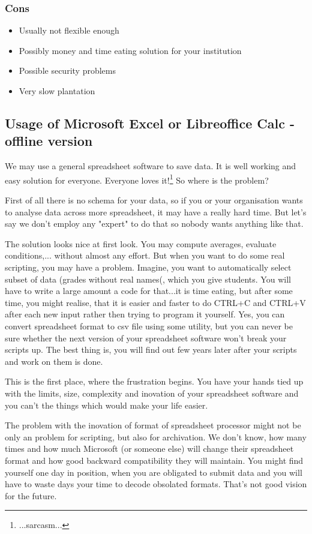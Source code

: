\subsubsection{Cons}
\begin{itemize}
\item Usually not flexible enough
\item Possibly money and time eating solution for your institution
\item Possible security problems
\item Very slow plantation
\end{itemize}

\subsection{Usage of Microsoft Excel or Libreoffice Calc - offline version}
We may use a general spreadsheet software to save data. It is well working and easy solution for everyone. Everyone loves it!\footnote{...sarcasm...} So where is the problem?

First of all there is no schema for your data, so if you or your organisation wants to analyse data across more spreadsheet, it may have a really hard time. But let's say we don't employ any "expert" to do that so nobody wants anything like that.

The solution looks nice at first look. You may compute averages, evaluate conditions,... without almost any effort. But when you want to do some real scripting, you may have a problem. Imagine, you want to automatically select subset of data (grades without real names(, which you give students. You will have to write a large amount a code for that...it is time eating, but after some time, you might realise, that it is easier and faster to do CTRL+C and CTRL+V after each new input rather then trying to program it yourself. Yes, you can convert spreadsheet format to csv file using some utility, but you can never be sure whether the next version of your spreadsheet software won't break your scripts up. The best thing is, you will find out few years later after your scripts and work on them is done.

This is the first place, where the frustration begins. You have your hands tied up with the limits, size, complexity and inovation of your spreadsheet software and you can't the things which would make your life easier.

The problem with the inovation of format of spreadsheet processor might not be only an problem for scripting, but also for archivation. We don't know, how many times and how much Microsoft (or someone else) will change their spreadsheet format and how good backward compatibility they will maintain. You might find yourself one day in position, when you are obligated to submit data and you will have to waste days your time to decode obsolated formats. That's not good vision for the future.

